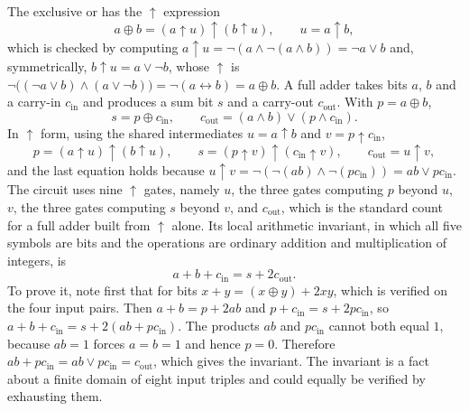 \documentclass[11pt]{article}
\theoremstyle{definition}
\theoremstyle{remark}
\newcommand{\nand}{\uparrow}
\begin{document}
The exclusive or has the $\nand$ expression
\[
a \oplus b = (a \nand u) \nand (b \nand u), \qquad u = a \nand b,
\]
which is checked by computing $a \nand u = \neg(a \land \neg(a \land b)) = \neg a \lor b$ and, symmetrically, $b \nand u = a \lor \neg b$, whose $\nand$ is $\neg\big((\neg a \lor b) \land (a \lor \neg b)\big) = \neg(a \leftrightarrow b) = a \oplus b$. A full adder takes bits $a$, $b$ and a carry-in $c_{\mathrm{in}}$ and produces a sum bit $s$ and a carry-out $c_{\mathrm{out}}$. With $p = a \oplus b$,
\[
s = p \oplus c_{\mathrm{in}}, \qquad c_{\mathrm{out}} = (a \land b) \lor (p \land c_{\mathrm{in}}).
\]
In $\nand$ form, using the shared intermediates $u = a \nand b$ and $v = p \nand c_{\mathrm{in}}$,
\[
p = (a \nand u) \nand (b \nand u), \qquad
s = (p \nand v) \nand (c_{\mathrm{in}} \nand v), \qquad
c_{\mathrm{out}} = u \nand v,
\]
and the last equation holds because $u \nand v = \neg(\neg(ab) \land \neg(p c_{\mathrm{in}})) = ab \lor p c_{\mathrm{in}}$. The circuit uses nine $\nand$ gates, namely $u$, the three gates computing $p$ beyond $u$, $v$, the three gates computing $s$ beyond $v$, and $c_{\mathrm{out}}$, which is the standard count for a full adder built from $\nand$ alone. Its local arithmetic invariant, in which all five symbols are bits and the operations are ordinary addition and multiplication of integers, is
\[
a + b + c_{\mathrm{in}} = s + 2c_{\mathrm{out}} .
\]
To prove it, note first that for bits $x + y = (x \oplus y) + 2xy$, which is verified on the four input pairs. Then $a + b = p + 2ab$ and $p + c_{\mathrm{in}} = s + 2p c_{\mathrm{in}}$, so $a + b + c_{\mathrm{in}} = s + 2(ab + p c_{\mathrm{in}})$. The products $ab$ and $p c_{\mathrm{in}}$ cannot both equal $1$, because $ab = 1$ forces $a = b = 1$ and hence $p = 0$. Therefore $ab + p c_{\mathrm{in}} = ab \lor p c_{\mathrm{in}} = c_{\mathrm{out}}$, which gives the invariant. The invariant is a fact about a finite domain of eight input triples and could equally be verified by exhausting them.
\end{document}
